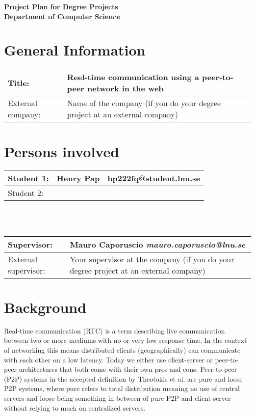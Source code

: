 \documentclass[12pt]{article}
\begin{document}
\begin{center}
\Large \textbf{Project Plan for Degree Projects} \\
\large \textbf{Department of Computer Science}
\end{center}

\section*{General Information}
\begin{tabular} {|p{3.8cm}|p{9cm}|} \hline
Title: & Reel-time communication using a peer-to-peer network in the web \\ \hline
External company: & Name of the company (if you do your degree project at an external company) \\ \hline
\end{tabular}

\section*{Persons involved}
\begin{tabular} {|p{2.2cm}|p{4.7cm}|p{5.47cm}|} \hline
Student 1: & Henry Pap & hp222fq@student.lnu.se \\ \hline
Student 2: &  &  \\ \hline
\end{tabular}
\\ \vspace*{0.2cm} \\
\begin{tabular} {|p{3.9cm}|p{8.9cm}|} \hline
Supervisor: & Mauro Caporuscio \textit{mauro.caporuscio@lnu.se} \\ \hline
External supervisor: & Your supervisor at the company (if you do your degree project at an external company) \\ \hline
\end{tabular}

\section*{Background}
Real-time communication (RTC) \cite{Techopedia:RTCdefinition} is a term describing live communication between two or more mediums
with no or very low response time. In the context of networking this means distributed clients (geographically) 
can communicate with each other on a low latency. Today we either use client-server or peer-to-peer architectures
that both come with their own pros and cons. 
Peer-to-peer (P2P) systems in the accepted definition by Theotokis et al. \cite{Androutsellis-Theotokis:2004:SPC:1041680.1041681} are pure and loose P2P systems, where pure refers to total
distribution meaning no use of central servers and loose being something in between of pure P2P and client-server 
without relying to much on centralized servers. 
\pagebreak 
\end{document}
